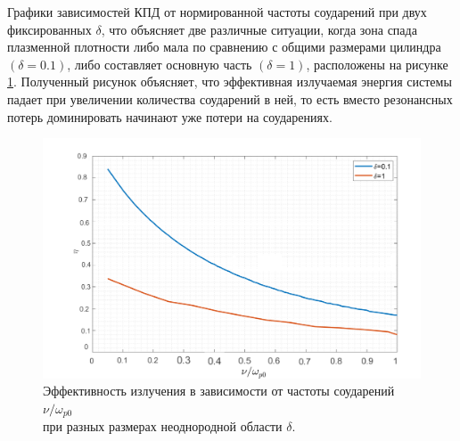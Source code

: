 \newpage
Графики зависимостей КПД от нормированной частоты соударений при двух фиксированных $\delta$, что объясняет две различные ситуации, когда зона спада плазменной плотности либо мала по сравнению с общими размерами цилиндра $\left(\delta=0.1\right)$, либо составляет основную часть $\left(\delta=1\right)$, расположены на рисунке \ref{ris:kpd_nu}. Полученный рисунок объясняет, что эффективная излучаемая энергия системы падает при увеличении количества соударений в ней, то есть вместо резонансных потерь доминировать начинают уже потери на соударениях.

\begin{figure}[H]\centering
	\captionsetup{justification=centering}
	\includegraphics[width=1\linewidth]{pics/kpd_nu}
	\caption{Эффективность излучения в зависимости от частоты соударений $\nu/\omega_{p0}$ \\при разных размерах неоднородной области $\delta$.}
	\label{ris:kpd_nu}
\end{figure}
